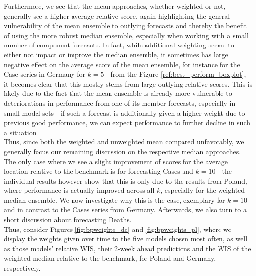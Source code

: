 Furthermore, we see that the mean approaches, whether weighted or not, generally see a higher average relative score, again highlighting the general vulnerability of the mean ensemble to outlying forecasts and thereby the benefit of using the more robust median ensemble, especially when working with a small number of component forecasts. 
In fact, while additional weighting seems to either not impact or improve the median ensemble, it sometimes has large negative effect on the average score of the mean ensemble, for instance for the Case series in Germany for $k = 5$ - from the Figure \ref{ref:best_perform_boxplot}, it becomes clear that this mostly stems from large outlying relative scores. This is likely due to the fact that the mean ensemble is already more vulnerable to deteriorations in performance from one of its member forecasts, especially in small model sets - if such a forecast is additionally given a higher weight due to previous good performance, we can expect performance to further decline in such a situation.\\
Thus, since both the weighted and unweighted mean compared unfavorably, we generally focus our remaining discussion on the respective median approaches. \medskip\\
The only case where we see a slight improvement of scores for the average location relative to the benchmark is for forecasting Cases and $k = 10$ - the individual results however show that this is only due to the results from Poland, where performance is actually improved across all $k$, especially for the weighted median ensemble. We now investigate why this is the case, exemplary for $k = 10$ and in contrast to the Cases series from Germany. Afterwards, we also turn to a short discussion about forecasting Deaths.\\
Thus, consider Figures \ref{fig:bpweights_de} and \ref{fig:bpweights_pl}, where we display the weights given over time to the five models chosen most often, as well as those models' relative WIS, their 2-week ahead predictions and the WIS of the weighted median relative to the benchmark, for Poland and Germany, respectively.
